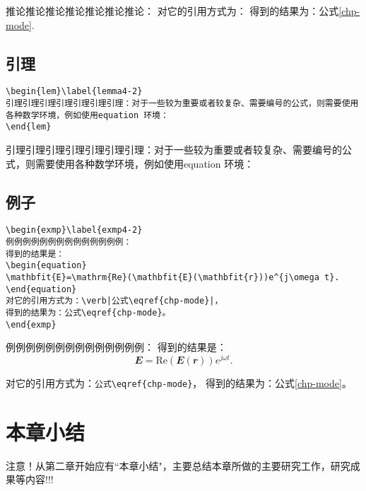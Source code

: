 \begin{cor}\label{cor4-2}
推论推论推论推论推论推论推论：
对它的引用方式为：
得到的结果为：公式\eqref{chp-mode}.
\end{cor}

\subsection{引理}\label{lem}
\begin{verbatim}
\begin{lem}\label{lemma4-2}
引理引理引理引理引理引理引理：对于一些较为重要或者较复杂、需要编号的公式，则需要使用各种数学环境，例如使用equation 环境：
\end{lem}
\end{verbatim}
\begin{lem}\label{lemma4-2}
引理引理引理引理引理引理引理：对于一些较为重要或者较复杂、需要编号的公式，则需要使用各种数学环境，例如使用equation 环境：
\end{lem}

\subsection{例子}\label{exmp}
\begin{verbatim}
\begin{exmp}\label{exmp4-2}
例例例例例例例例例例例例例例：
得到的结果是：
\begin{equation}
\mathbfit{E}=\mathrm{Re}(\mathbfit{E}(\mathbfit{r}))e^{j\omega t}.
\end{equation}
对它的引用方式为：\verb|公式\eqref{chp-mode}|，
得到的结果为：公式\eqref{chp-mode}。
\end{exmp}
\end{verbatim}
\begin{exmp}\label{exmp4-2}
例例例例例例例例例例例例例例：
得到的结果是：
\begin{equation}
\mathbfit{E}=\mathrm{Re}(\mathbfit{E}(\mathbfit{r}))e^{j\omega t}.
\end{equation}

对它的引用方式为：\verb|公式\eqref{chp-mode}|，
得到的结果为：公式\eqref{chp-mode}。
\end{exmp}

\section{本章小结}\label{section4-10}
注意！从第二章开始应有``本章小结"，主要总结本章所做的主要研究工作，研究成果等内容!!!

%
